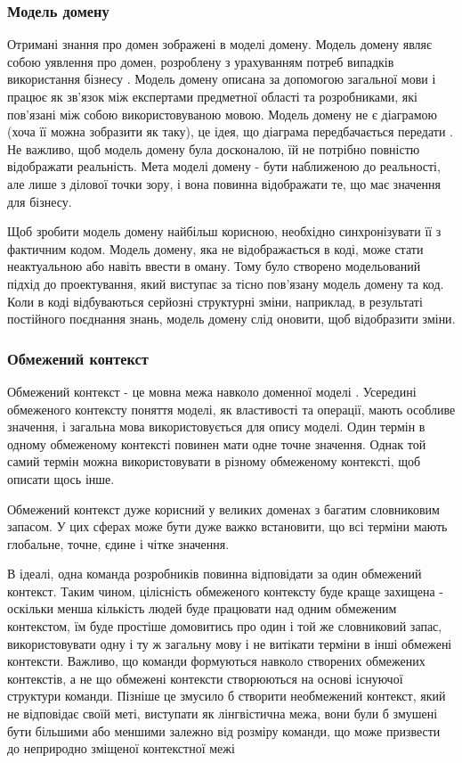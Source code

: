\subsubsection{Модель домену}
Отримані знання про домен зображені в моделі домену.
Модель домену являє собою уявлення про домен, розроблену з урахуванням
потреб випадків використання бізнесу \cite{ddd-millett}.
Модель домену описана за допомогою загальної мови
і працює як зв'язок між експертами предметної області та розробниками,
які пов'язані між собою використовуваною мовою.
Модель домену не є діаграмою (хоча її можна зобразити як таку),
це ідея, що діаграма передбачається передати \cite{ddd-evans}.
Не важливо, щоб модель домену була досконалою,
їй не потрібно повністю відображати реальність.
Мета моделі домену - бути наближеною до реальності, але лише з ділової точки зору,
і вона повинна відображати те, що має значення для бізнесу.

Щоб зробити модель домену найбільш корисною,
необхідно синхронізувати її з фактичним кодом.
Модель домену, яка не відображається в коді,
може стати неактуальною або навіть ввести в оману.
Тому було створено модельований підхід до проектування,
який виступає за тісно пов'язану модель домену та код.
Коли в коді відбуваються серйозні структурні зміни,
наприклад, в результаті постійного поєднання знань,
модель домену слід оновити, щоб відобразити зміни\cite{ddd-evans}.

\subsubsection{Обмежений контекст}

Обмежений контекст - це мовна межа навколо доменної моделі \cite{ddd-vernon}.
Усередині обмеженого контексту поняття моделі, як властивості
та операції, мають особливе значення, і загальна мова використовується для опису моделі.
Один термін в одному обмеженому контексті повинен мати одне точне значення.
Однак той самий термін можна використовувати в різному обмеженому контексті, щоб описати щось інше.

Обмежений контекст дуже корисний у великих доменах з багатим словниковим запасом.
У цих сферах може бути дуже важко встановити,
що всі терміни мають глобальне, точне, єдине і чітке значення.

В ідеалі, одна команда розробників повинна відповідати за один обмежений контекст.
Таким чином, цілісність обмеженого контексту буде краще захищена -
оскільки менша кількість людей буде працювати над одним обмеженим контекстом,
їм буде простіше домовитись про один і той же словниковий запас,
використовувати одну і ту ж загальну мову і не витікати терміни в
інші обмежені контексти. Важливо, що команди формуються навколо
створених обмежених контекстів, а не що обмежені контексти
створюються на основі існуючої структури команди. Пізніше це
змусило б створити необмежений контекст, який не відповідає своїй меті,
виступати як лінгвістична межа, вони були б змушені бути більшими або
меншими залежно від розміру команди, що може призвести до неприродно зміщеної контекстної межі

